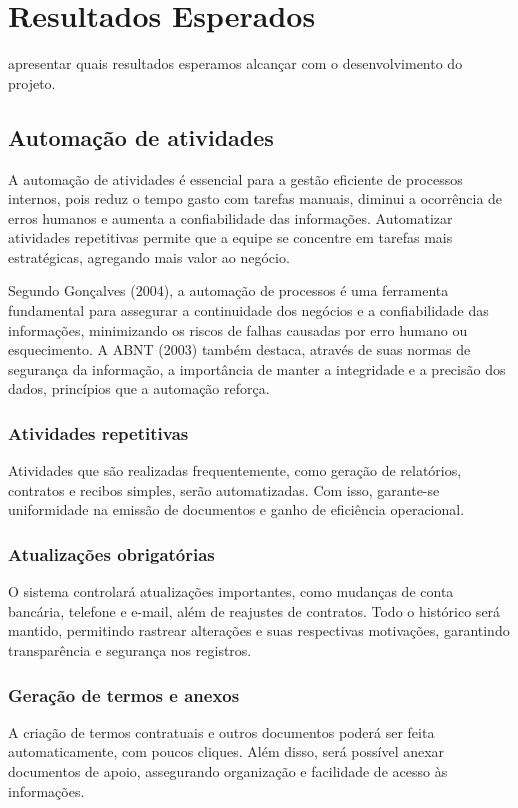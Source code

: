 \documentclass[../main.tex]{subfiles}
\begin{document}
\section{Resultados Esperados}
apresentar quais resultados esperamos alcançar com o desenvolvimento do projeto.


\subsection{Automação de atividades} A automação de atividades é essencial para a gestão eficiente de processos internos, pois reduz 
o tempo gasto com tarefas manuais, diminui a ocorrência de erros humanos e aumenta a confiabilidade das informações. Automatizar atividades 
repetitivas permite que a equipe se concentre em tarefas mais estratégicas, agregando mais valor ao negócio.

Segundo Gonçalves (2004), a automação de processos é uma ferramenta fundamental para assegurar a continuidade dos negócios e a 
confiabilidade das informações, minimizando os riscos de falhas causadas por erro humano ou esquecimento. A ABNT (2003) também 
destaca, através de suas normas de segurança da informação, a importância de manter a integridade e a precisão dos dados, princípios 
que a automação reforça.

    \subsubsection{Atividades repetitivas} 
    Atividades que são realizadas frequentemente, como geração de relatórios, contratos e recibos simples, serão automatizadas. Com 
    isso, garante-se uniformidade na emissão de documentos e ganho de eficiência operacional.

    \subsubsection{Atualizações obrigatórias} 
    O sistema controlará atualizações importantes, como mudanças de conta bancária, telefone e e-mail, além de reajustes de contratos. 
    Todo o histórico será mantido, permitindo rastrear alterações e suas respectivas motivações, garantindo transparência e segurança 
    nos registros.

    \subsubsection{Geração de termos e anexos} 
    A criação de termos contratuais e outros documentos poderá ser feita automaticamente, com poucos cliques. Além disso, será 
    possível anexar documentos de apoio, assegurando organização e facilidade de acesso às informações.
\end{document}
